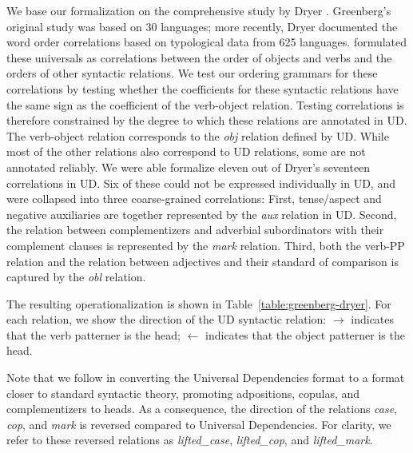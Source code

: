 \documentclass[10pt,twoside,lineno]{article}
\begin{document}
We base our formalization on the comprehensive study by Dryer \cite{dryer1992greenbergian}.
Greenberg's original study was based on 30 languages; more recently, Dryer \cite{dryer1992greenbergian} documented the word order correlations based on typological data from 625 languages.
\cite{dryer1992greenbergian} formulated these universals as correlations between the order of objects and verbs and the orders of other syntactic relations.
We test our ordering grammars for these correlations by testing whether the coefficients for these syntactic relations have the same sign as the coefficient of the verb-object relation.
Testing correlations is therefore constrained by the degree to which these relations are annotated in UD.
The verb-object relation corresponds to the  \emph{obj} relation defined by UD.
While most of the other relations also correspond to UD relations, some are not annotated reliably.
We were able formalize eleven out of Dryer's seventeen correlations in UD.
Six of these could not be expressed individually in UD, and were collapsed into three coarse-grained correlations:
First, tense/aspect and negative auxiliaries are together represented by the \emph{aux} relation in UD.
Second, the relation between complementizers and adverbial subordinators with their complement clauses is represented by the \emph{mark} relation.
Third, both the verb-PP relation and the relation between adjectives and their standard of comparison is captured by the \emph{obl} relation.

The resulting operationalization is shown in Table~\ref{table:greenberg-dryer}.
For each relation, we show the direction of the UD syntactic relation: $\rightarrow$ indicates that the verb patterner is the head; $\leftarrow$ indicates that the object patterner is the head.

Note that we follow \cite{futrell2015largescale} in converting the Universal Dependencies format to a format closer to standard syntactic theory, promoting adpositions, copulas, and complementizers to heads.
As a consequence, the direction of the relations \emph{case}, \emph{cop}, and \emph{mark} is reversed compared to Universal Dependencies.
For clarity, we refer to these reversed relations as \emph{lifted\_case}, \emph{lifted\_cop}, and \emph{lifted\_mark}.
\end{document}

